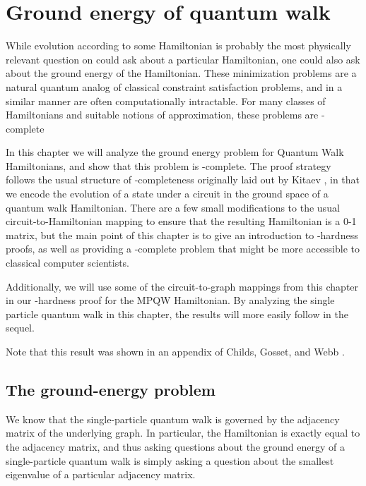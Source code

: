 \documentclass[../thesis-main/thesis-main]{subfiles}
\begin{document}
\chapter{Ground energy of quantum walk}
\label{chap:SP_ground}

While evolution according to some Hamiltonian is probably the most physically relevant question on could ask about a particular Hamiltonian, one could also ask about the ground energy of the Hamiltonian.  These minimization problems are a natural quantum analog of classical constraint satisfaction problems, and in a similar manner are often computationally intractable.  For many classes of Hamiltonians and suitable notions of approximation, these problems are \QMA-complete

In this chapter we will analyze the ground energy problem for Quantum Walk Hamiltonians, and show that this problem is \QMA-complete.  The proof strategy follows the usual structure of \QMA-completeness originally laid out by Kitaev \cite{KSV02}, in that we encode the evolution of a state under a circuit in the ground space of a quantum walk Hamiltonian.  There are a few small modifications to the usual circuit-to-Hamiltonian mapping to ensure that the resulting Hamiltonian is a 0-1 matrix, but the main point of this chapter is to give an introduction to \QMA-hardness proofs, as well as providing a \QMA-complete problem that might be more accessible to classical computer scientists.  

Additionally, we will use some of the circuit-to-graph mappings from this chapter in our \QMA-hardness proof for the MPQW Hamiltonian.  By analyzing the single particle quantum walk in this chapter, the results will more easily follow in the sequel.  

Note that this result was shown in an appendix of Childs, Gosset, and Webb \cite{BHQMA}.

\section{The ground-energy problem}

We know that the single-particle quantum walk is governed by the adjacency matrix of the underlying graph.  In particular, the Hamiltonian is exactly equal to the adjacency matrix, and thus asking questions about the ground energy of a single-particle quantum walk is simply asking a question about the smallest eigenvalue of a particular adjacency matrix.
\end{document}
